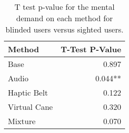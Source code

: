 
\begin{table}[!htb]
\centering
\caption{T test p-value for the mental demand on each method for blinded users versus sighted users.}
\label{tab:ttest_mental_demand}
\begin{tabular}{lr}
\toprule
      Method & T-Test P-Value \\
\midrule
        Base &          0.897 \\
       Audio &        0.044** \\
 Haptic Belt &          0.122 \\
Virtual Cane &          0.320 \\
     Mixture &          0.070 \\
\bottomrule
\end{tabular}
\end{table}


